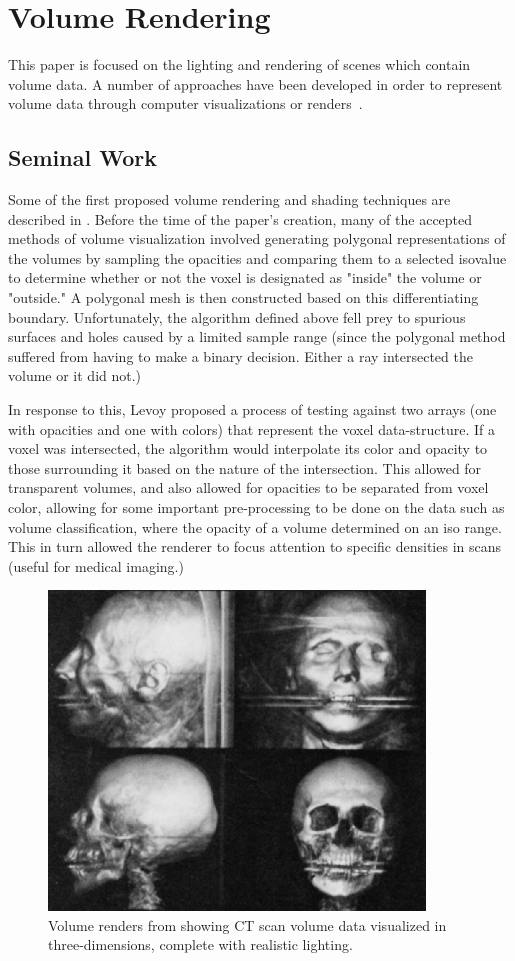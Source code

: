 \documentclass[12pt]{ucthesis}
\begin{document}
\section{Volume Rendering}
This paper is focused on the lighting and rendering of scenes which contain volume data.  A number of approaches have been developed in order to represent volume data through computer visualizations or renders~\cite{levoy88}\cite{Kajiya84}.

\subsection{Seminal Work}
Some of the first proposed volume rendering and shading techniques are described in \cite{levoy88}.  Before the time of the paper's creation, many of the accepted methods of volume visualization involved generating polygonal representations of the volumes by sampling the opacities and comparing them to a selected isovalue to determine whether or not the voxel is designated as "inside" the volume or "outside."  A polygonal mesh is then constructed based on this differentiating boundary.  Unfortunately, the algorithm defined above fell prey to spurious surfaces and holes caused by a limited sample range (since the polygonal method suffered from having to make a binary decision.  Either a ray intersected the volume or it did not.)

In response to this, Levoy proposed a process of testing against two arrays (one with opacities and one with colors) that represent the voxel data-structure.  If a voxel was intersected, the algorithm would interpolate its color and opacity to those surrounding it based on the nature of the intersection.  This allowed for transparent volumes, and also allowed for opacities to be separated from voxel color, allowing for some important pre-processing to be done on the data such as volume classification, where the opacity of a volume determined on an iso range.  This in turn allowed the renderer to focus attention to specific densities in scans (useful for medical imaging.)

\begin{figure}[h!]
    \centering
    \includegraphics[width=100mm]{img/external/img188.png}
    \caption{Volume renders from \cite{levoy88} showing CT scan volume data visualized in three-dimensions, complete with realistic lighting. }
    \label{fig:levoy}
\end{figure}
\end{document}
